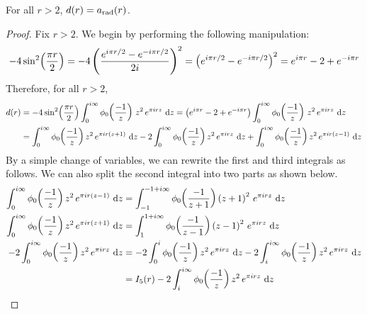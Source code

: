 \begin{boxproposition}\label{Ch4:Prop:a_eq_d}
    For all $r > 2$, $d(r) = a_{\operatorname{rad}}(r)$.
\end{boxproposition}
\begin{proof}
    Fix $r > 2$. We begin by performing the following manipulation:
    \begin{align}
        -4 \sin^2\!\left( \frac{\pi r}{2} \right)
        = -4 \left( \frac{e^{i \pi r / 2} - e^{-i \pi r / 2}}{2i} \right)^2
        = \left( e^{i \pi r / 2} - e^{- i \pi r / 2} \right)^2
        = e^{i \pi r} - 2 + e^{-i \pi r}
        \label{Ch4:Eq:sinsq_trick_for_double_zeroes}
    \end{align}
    Therefore, for all $r > 2$,
    \begin{align*}
        d(r)
        &= -4 \sinsq{\frac{\pi r}{2}} \int_{0}^{i \infty} \phi_0\of{\frac{-1}{z}} \, z^2 \, e^{\pi i r z} \, \diff{z}
        = \parenth{e^{i \pi r} - 2 + e^{-i \pi r}} \int_{0}^{i \infty} \phi_0\of{\frac{-1}{z}} \, z^2 \, e^{\pi i r z} \, \diff{z} \\
        &= \int_{0}^{i \infty} \phi_0\of{\frac{-1}{z}} z^2 \, e^{\pi i r \parenth{z + 1}} \, \diff{z}
        -2 \int_{0}^{i \infty} \phi_0\of{\frac{-1}{z}} z^2 \, e^{\pi i r z} \, \diff{z}
        + \int_{0}^{i \infty} \phi_0\of{\frac{-1}{z}} z^2 \, e^{\pi i r \parenth{z - 1}} \, \diff{z}
    \end{align*}
    By a simple change of variables, we can rewrite the first and third integrals as follows. We can also split the second integral into two parts as shown below.
    \begin{align*}
        \int_{0}^{i \infty} \phi_0\of{\frac{-1}{z}} z^2 \, e^{\pi i r \parenth{z - 1}} \, \diff{z}
        &=
        \int_{-1}^{-1 + i \infty} \phi_0\of{\frac{-1}{z + 1}} \parenth{z + 1}^2 \, e^{\pi i r z} \, \diff{z} \\
        \int_{0}^{i \infty} \phi_0\of{\frac{-1}{z}} z^2 \, e^{\pi i r \parenth{z + 1}} \, \diff{z}
        &=
        \int_{1}^{1 + i \infty} \phi_0\of{\frac{-1}{z - 1}} \parenth{z - 1}^2 \, e^{\pi i r z} \, \diff{z} \\
        -2 \int_{0}^{i \infty} \phi_0\of{\frac{-1}{z}} z^2 \, e^{\pi i r z} \, \diff{z}
        &=
        -2 \int_{0}^{i} \phi_0\of{\frac{-1}{z}} z^2 \, e^{\pi i r z} \, \diff{z}
        -2 \int_{i}^{i \infty} \phi_0\of{\frac{-1}{z}} z^2 \, e^{\pi i r z} \, \diff{z} \\
        &= I_5(r) - 2\int_{i}^{i \infty} \phi_0\of{\frac{-1}{z}} z^2 \, e^{\pi i r z} \, \diff{z}
    \end{align*}

\end{proof}
